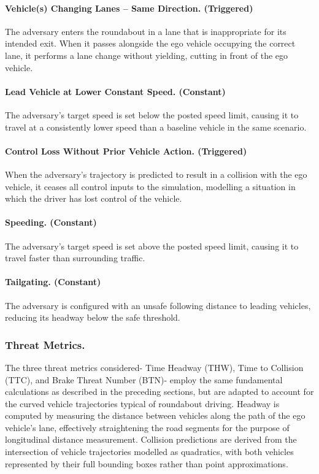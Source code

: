\paragraph{Vehicle(s) Changing Lanes – Same Direction. (Triggered)}
The adversary enters the roundabout in a lane that is inappropriate for its intended exit. When it passes alongside the ego vehicle occupying the correct lane, it performs a lane change without yielding, cutting in front of the ego vehicle.

\paragraph{Lead Vehicle at Lower Constant Speed. (Constant)}
The adversary's target speed is set below the posted speed limit, causing it to travel at a consistently lower speed than a baseline vehicle in the same scenario.

\paragraph{Control Loss Without Prior Vehicle Action. (Triggered)}
When the adversary's trajectory is predicted to result in a collision with the ego vehicle, it ceases all control inputs to the simulation, modelling a situation in which the driver has lost control of the vehicle.

\paragraph{Speeding. (Constant)}
The adversary's target speed is set above the posted speed limit, causing it to travel faster than surrounding traffic.

\paragraph{Tailgating. (Constant)}
The adversary is configured with an unsafe following distance to leading vehicles, reducing its headway below the safe threshold.


\subsubsection{Threat Metrics.}

The three threat metrics considered- Time Headway (THW), Time to Collision (TTC), and Brake Threat Number (BTN)- employ the same fundamental calculations as described in the preceding sections, but are adapted to account for the curved vehicle trajectories typical of roundabout driving. Headway is computed by measuring the distance between vehicles along the path of the ego vehicle's lane, effectively straightening the road segments for the purpose of longitudinal distance measurement. Collision predictions are derived from the intersection of vehicle trajectories modelled as quadratics, with both vehicles represented by their full bounding boxes rather than point approximations.


